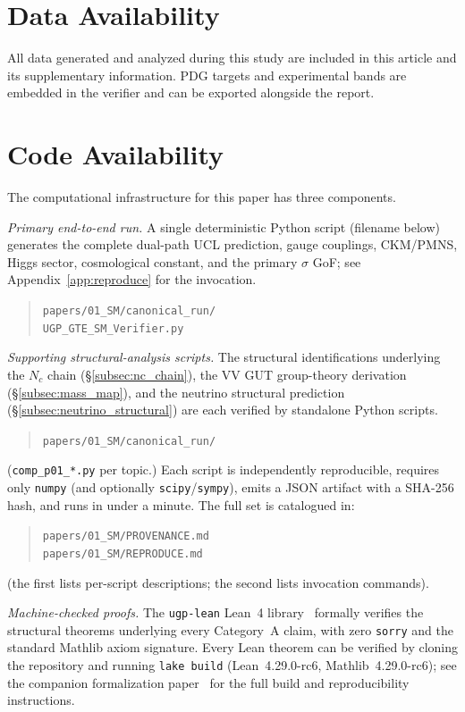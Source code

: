 \documentclass[11pt]{article}
\theoremstyle{remark}
\begin{document}
\section*{Data Availability}
All data generated and analyzed during this study are included in this article and its supplementary information.
PDG targets and experimental bands are embedded in the verifier and can be exported alongside the report.

\section*{Code Availability}
The computational infrastructure for this paper has three components.

\emph{Primary end-to-end run.}  A single deterministic Python script (filename below) generates the complete dual-path UCL prediction, gauge couplings, CKM/PMNS, Higgs sector, cosmological constant, and the primary $\sigma$ GoF; see Appendix~\ref{app:reproduce} for the invocation.
\begin{quote}
\small\raggedright\sloppy
\noindent\texttt{papers/01\_SM/canonical\_run/}\\
\texttt{UGP\_GTE\_SM\_Verifier.py}
\end{quote}

\emph{Supporting structural-analysis scripts.}  The structural identifications underlying the $N_c$ chain (\S\ref{subsec:nc_chain}), the VV GUT group-theory derivation (\S\ref{subsec:mass_map}), and the neutrino structural prediction (\S\ref{subsec:neutrino_structural}) are each verified by standalone Python scripts.
\begin{quote}
\small\raggedright\sloppy
\noindent\texttt{papers/01\_SM/canonical\_run/}
\end{quote}
\noindent
(\texttt{comp\_p01\_*.py} per topic.)
\noindent
Each script is independently reproducible, requires only \texttt{numpy} (and optionally \texttt{scipy}/\texttt{sympy}), emits a JSON artifact with a SHA-256 hash, and runs in under a minute.  The full set is catalogued in:
\begin{quote}
\small\raggedright\sloppy
\noindent\texttt{papers/01\_SM/PROVENANCE.md}\\
\noindent\texttt{papers/01\_SM/REPRODUCE.md}
\end{quote}
\noindent
(the first lists per-script descriptions; the second lists invocation commands).

\emph{Machine-checked proofs.}  The \texttt{ugp-lean} Lean~4 library~\cite{ugp-lean} formally verifies the structural theorems underlying every Category~A claim, with zero \texttt{sorry} and the standard Mathlib axiom signature.  Every Lean theorem can be verified by cloning the repository and running \texttt{lake build} (Lean~4.29.0-rc6, Mathlib~4.29.0-rc6); see the companion formalization paper~\cite{SpivackUGPFormalization} for the full build and reproducibility instructions.
\end{document}
